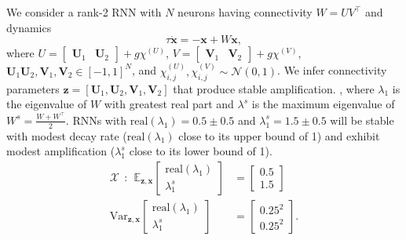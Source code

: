 \documentclass[11pt]{article}
\begin{document}
We consider a rank-2 RNN with $N$ neurons having connectivity $W = UV^\top$
 and dynamics
 \begin{equation}
 \tau \dot{\mathbf{x}} = -\mathbf{x} + W\mathbf{x},
 \end{equation}
where $U = \begin{bmatrix} \mathbf{U}_1 & \mathbf{U}_2 \end{bmatrix} + g \chi^{(U)}$, $V = \begin{bmatrix} \mathbf{V}_1 & \mathbf{V}_2 \end{bmatrix} + g\chi^{(V)}$, $\mathbf{U}_1 \mathbf{U}_2, \mathbf{V}_1, \mathbf{V}_2 \in \left[-1, 1 \right]^N$, and $\chi^{(U)}_{i,j}, \chi^{(V)}_{i,j} \sim \mathcal{N}(0, 1)$.
We infer connectivity parameters $\mathbf{z} = \left[\mathbf{U}_1, \mathbf{U}_2, \mathbf{V}_1, \mathbf{V}_2 \right]$   that produce stable amplification.
, where $\lambda_1$ is the eigenvalue of $W$ with greatest real part and $\lambda^s$ is the maximum eigenvalue of $W^s = \frac{W + W^\top}{2}$.
RNNs  with $\text{real}(\lambda_1) = 0.5 \pm 0.5$ and $\lambda_1^s = 1.5 \pm 0.5$ will be stable with modest decay rate ($\text{real}(\lambda_1)$ close to its upper bound of 1) and exhibit modest amplification ($\lambda_1^s$ close to its lower bound of 1).
\begin{equation}\label{eq:EP_LRRNN}
\begin{split}
\mathcal{X} ~~:~~ \mathbb{E}_{\mathbf{z}, \mathbf{x}} \begin{bmatrix} \text{real}(\lambda_1) \\ \lambda^s_1 \end{bmatrix} &= \begin{bmatrix} 0.5 \\ 1.5 \end{bmatrix} \\
\text{Var}_{\mathbf{z}, \mathbf{x}} \begin{bmatrix} \text{real}(\lambda_1) \\ \lambda^s_1 \end{bmatrix} &= \begin{bmatrix} 0.25^2 \\ 0.25^2 \end{bmatrix}.
\end{split}
\end{equation}
\end{document}
